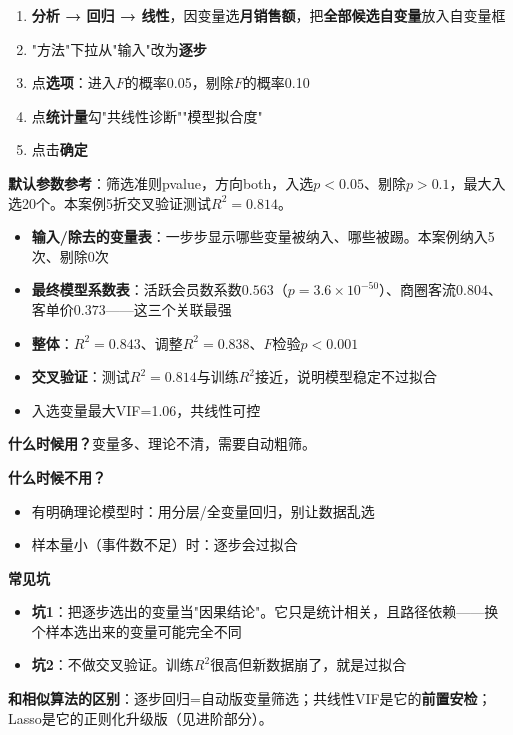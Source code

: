 \begin{algosposs}
\begin{enumerate}
    \item \textbf{分析 → 回归 → 线性}，因变量选\textbf{月销售额}，把\textbf{全部候选自变量}放入自变量框
    \item "方法"下拉从"输入"改为\textbf{逐步}
    \item 点\textbf{选项}：进入$F$的概率0.05，剔除$F$的概率0.10
    \item 点\textbf{统计量}勾"共线性诊断""模型拟合度"
    \item 点击\textbf{确定}
\end{enumerate}

\textbf{默认参数参考}：筛选准则pvalue，方向both，入选$p<0.05$、剔除$p>0.1$，最大入选20个。本案例5折交叉验证测试$R^2=0.814$。
\end{algosposs}

\begin{algoresult}
\begin{itemize}
    \item \textbf{输入/除去的变量表}：一步步显示哪些变量被纳入、哪些被踢。本案例纳入5次、剔除0次
    \item \textbf{最终模型系数表}：活跃会员数系数$0.563$（$p=3.6\times10^{-50}$）、商圈客流$0.804$、客单价$0.373$——这三个关联最强
    \item \textbf{整体}：$R^2=0.843$、调整$R^2=0.838$、$F$检验$p<0.001$
    \item \textbf{交叉验证}：测试$R^2=0.814$与训练$R^2$接近，说明模型稳定不过拟合
    \item 入选变量最大VIF=1.06，共线性可控
\end{itemize}
\end{algoresult}

\begin{algonotes}
\textbf{什么时候用？}变量多、理论不清，需要自动粗筛。

\textbf{什么时候不用？}
\begin{itemize}
    \item 有明确理论模型时：用分层/全变量回归，别让数据乱选
    \item 样本量小（事件数不足）时：逐步会过拟合
\end{itemize}

\textbf{常见坑}
\begin{itemize}
    \item \textbf{坑1}：把逐步选出的变量当"因果结论"。它只是统计相关，且路径依赖——换个样本选出来的变量可能完全不同
    \item \textbf{坑2}：不做交叉验证。训练$R^2$很高但新数据崩了，就是过拟合
\end{itemize}

\textbf{和相似算法的区别}：逐步回归=自动版变量筛选；共线性VIF是它的\textbf{前置安检}；Lasso是它的正则化升级版（见进阶部分）。
\end{algonotes}

